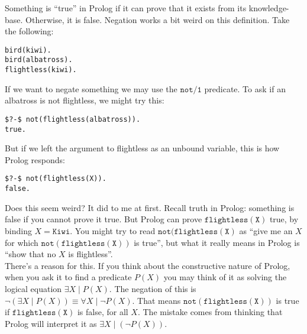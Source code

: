 \documentclass[a4paper,12pt]{article}
\newcommand{\kwa}[1]{\mathtt{#1}}
\begin{document}
\noindent
Something is ``true'' in Prolog if it can prove that it exists from its knowledge-base. Otherwise, it is false. Negation works a bit weird on this definition. Take the following:

\begin{lstlisting}
bird(kiwi).
bird(albatross).
flightless(kiwi).
\end{lstlisting}

\noindent
If we want to negate something we may use the $\kwa{not \slash 1}$ predicate. To ask if an albatross is not flightless, we might try this:

\begin{lstlisting}
$?-$ not(flightless(albatross)).
true.
\end{lstlisting}

\noindent
But if we left the argument to flightless as an unbound variable, this is how Prolog responds:

\begin{lstlisting}
$?-$ not(flightless(X)).
false.
\end{lstlisting}

\noindent
Does this seem weird? It did to me at first. Recall truth in Prolog: something is false if you cannot prove it true. But Prolog can prove $\kwa{flightless(X)}$ true, by binding $X = \kwa{Kiwi}$. You might try to read $\kwa{not(flightless(X)}$ as ``give me an $X$ for which $\kwa{not(flightless(X))}$ is true'', but what it really means in Prolog is ``show that no $X$ is flightless''. \\

\noindent
There's a reason for this. If you think about the constructive nature of Prolog, when you ask it to find a predicate $P(X)$ you may think of it as solving the logical equation $\exists X \mid P(X)$. The negation of this is $\neg (\exists X \mid P(X)) \equiv \forall X \mid \neg P(X)$. That means $\kwa{not(flightless(X))}$ is true if $\kwa{flightless(X)}$ is false, for all $X$. The mistake comes from thinking that Prolog will interpret it as $\exists X \mid (\neg P(X))$.
\end{document}

